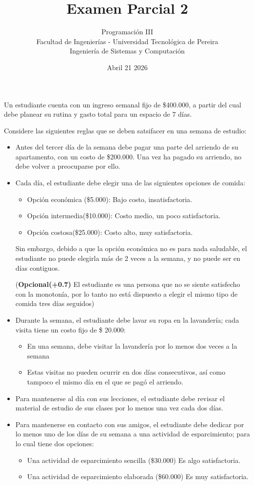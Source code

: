 \documentclass{article}
\title{Examen Parcial 2}
\author{Programación III \\ Facultad de Ingenierías - Universidad Tecnológica de Pereira \\ Ingeniería de Sistemas y Computación}
\date{Abril 21 2026}
\begin{document}
\maketitle
\thispagestyle{empty}

Un estudiante cuenta con un ingreso semanal fijo de \$400.000, a partir del cual debe planear su rutina y gasto total para un espacio de 7 días.

Considere las siguientes reglas que se deben satsifacer en una semana de estudio:

\begin{itemize}
  \item Antes del tercer día de la semana debe pagar una parte del arriendo de su apartamento, con un costo de \$200.000. Una vez ha pagado su arriendo, no debe volver a preocuparse por ello.
  \item Cada día, el estudiante debe elegir una de las siguientes opciones de comida:
  \begin{itemize}
    \item Opción económica (\$5.000): Bajo costo, insatisfactoria.
    \item Opción intermedia(\$10.000): Costo medio, un poco satisfactoria.
    \item Opción costosa(\$25.000): Costo alto, muy satisfactoria.
  \end{itemize}
  Sin embargo, debido a que la opción económica no es para nada saludable, el estudiante no puede elegirla más de 2 veces a la semana, y no puede ser en días contiguos.
  
  (\textbf{Opcional(+0.7)} El estudiante es una persona que no se siente satisfecho con la monotonía, por lo tanto no está dispuesto a elegir el mismo tipo de comida tres días seguidos)
  \item Durante la semana, el estudiante debe lavar su ropa en la lavandería; cada visita tiene un costo fijo de \$ 20.000:
  \begin{itemize}
    \item En una semana, debe visitar la lavandería por lo menos dos veces a la semana
    \item Estas visitas no pueden ocurrir en dos días consecutivos, así como tampoco el mismo día en el que se pagó el arriendo.
  \end{itemize}
  \item Para mantenerse al día con sus lecciones, el estudiante debe revisar el material de estudio de sus clases por lo menos una vez cada dos días.
  \item Para mantenerse en contacto con sus amigos, el estudiante debe dedicar por lo menos uno de los días de su semana a una actividad de esparcimiento; para lo cual tiene dos opciones: 
  \begin{itemize}
    \item Una actividad de esparcimiento sencilla (\$30.000) Es algo satisfactoria.
    \item Una actividad de esparcimiento elaborada (\$60.000) Es muy satisfactoria.
  \end{itemize}
\end{itemize}
\end{document}
